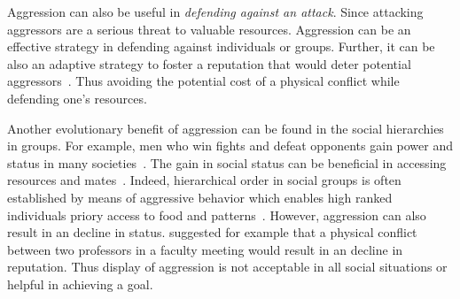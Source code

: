 Aggression can also be useful in \textit{defending against an attack}.
Since attacking aggressors are a serious threat to valuable resources.
Aggression can be an effective strategy in defending against individuals or groups.
Further, it can be also an adaptive strategy to foster a reputation that would deter potential aggressors~\cite{Buss1997}.
Thus avoiding the potential cost of a physical conflict while defending one's resources.

Another evolutionary benefit of aggression can be found in the social hierarchies in groups.
For example, men who win fights and defeat opponents gain power and status in many societies~\cite{Hill1996}.
The gain in social status can be beneficial in accessing resources and mates~\cite{Archer2009}.
Indeed, hierarchical order in social groups is often established by means of aggressive behavior which enables high ranked individuals priory access to food and patterns~\cite{Lindenfors2011}. 
However, aggression can also result in an decline in status.
\citet{Buss1997} suggested for example that a physical conflict between two professors in a faculty meeting would result in an decline in reputation.
Thus display of aggression is not acceptable in all social situations or helpful in achieving a goal.

